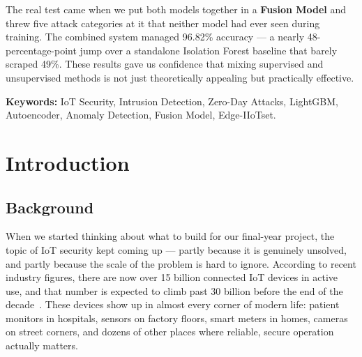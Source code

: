 \documentclass[12pt,a4paper]{report}
\begin{document}
\vspace{0.5cm}
\noindent The real test came when we put both models together in a \textbf{Fusion Model}
and threw five attack categories at it that neither model had ever seen during training.
The combined system managed 96.82\% accuracy — a nearly 48-percentage-point jump over a
standalone Isolation Forest baseline that barely scraped 49\%. These results gave us
confidence that mixing supervised and unsupervised methods is not just theoretically
appealing but practically effective.

\vspace{0.5cm}
\noindent \textbf{Keywords:} IoT Security, Intrusion Detection, Zero-Day Attacks,
LightGBM, Autoencoder, Anomaly Detection, Fusion Model, Edge-IIoTset.

\newpage
\tableofcontents

\newpage
\listoffigures
{}

\newpage
\listoftables
{}

\newpage
{}



\chapter{Introduction}

\section{Background}

When we started thinking about what to build for our final-year project, the
topic of IoT security kept coming up — partly because it is genuinely unsolved,
and partly because the scale of the problem is hard to ignore. According to
recent industry figures, there are now over 15 billion connected IoT devices in
active use, and that number is expected to climb past 30 billion before the end
of the decade~\cite{iot_growth}. These devices show up in almost every corner of
modern life: patient monitors in hospitals, sensors on factory floors, smart
meters in homes, cameras on street corners, and dozens of other places where
reliable, secure operation actually matters.
\end{document}
